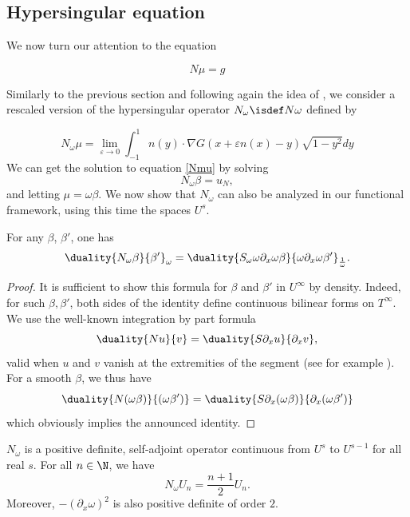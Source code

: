 \documentclass[a4paper]{article}
\begin{document}
	\subsection{Hypersingular equation} 
	
	We now turn our attention to the equation 
	
	\begin{equation}
	N\mu = g
	\label{Nmu}
	\end{equation} 
	
	Similarly to the previous section and following again the idea of \cite{bruno2012second}, we consider a rescaled version of the hypersingular operator $N_\omega \isdef N \omega$ defined by
	
	\[N_\omega \mu = \lim_{\varepsilon\to 0}\int_{-1}^{1} n(y)\cdot\nabla G(x + \varepsilon n(x) - y) \sqrt{1-y^2} dy\]
	We can get the solution to equation \eqref{Nmu} by solving 
	\begin{equation}
	N_\omega \beta = u_N,
	\label{Nomegabeta}
	\end{equation}
	and letting $\mu = \omega \beta$. 
	We now show that $N_\omega$ can also be analyzed in our functional framework, using this time the spaces $U^s$. 
	\begin{Lem}
		\label{lemIPP}
		For any $\beta$, $\beta'$, one has 
		\[\duality{N_\omega \beta}{ \beta'}_\omega = \duality{S_\omega \omega \partial_x \omega \beta}{\omega \partial_x \omega \beta'}_\frac{1}{\omega}.\]
		\begin{proof}
			It is sufficient to show this formula for $\beta$ and $\beta'$ in $U^{\infty}$ by density. Indeed, for such $\beta, \beta'$, both sides of the identity define continuous bilinear forms on $T^{\infty}$. We use the well-known integration by part formula
			\[\duality{N u}{v} = \duality{S\partial_x u}{\partial_x v},\]
			valid when $u$ and $v$ vanish at the extremities of the segment (see for example \cite{bruno2012second}). 
			For a smooth $\beta$, we thus have
			\[ \duality{N (\omega \beta)}{ (\omega \beta')} = \duality{S \partial_x(\omega \beta)}{\partial_x (\omega \beta')}\] 
			which obviously implies the announced identity. 
		\end{proof}
	\end{Lem}
	\begin{Prop}
		$N_\omega$ is a positive definite, self-adjoint operator continuous from $U^s$ to $U^{s-1}$ for all real $s$. For all $n \in \N$, we have 
		\[N_\omega U_n = \frac{n+1}{2}U_n.\]
		Moreover, $-(\partial_x\omega)^2$ is also positive definite of order $2$.
		\label{NUn}
	\end{Prop}
\end{document}
